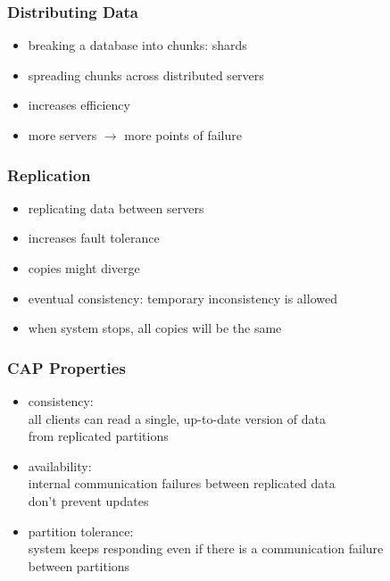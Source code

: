 \documentclass[dvipsnames]{beamer}
\theoremstyle{plain}
\begin{document}
\begin{frame}
  \frametitle{Distributing Data}

  \begin{itemize}
    \item breaking a database into chunks: \alert{shards}
    \item spreading chunks across distributed servers

    \medskip
    \item increases efficiency
    \item more servers $\rightarrow$ more points of failure
  \end{itemize}
\end{frame}

\begin{frame}
  \frametitle{Replication}

  \begin{itemize}
    \item replicating data between servers
    \item increases fault tolerance

    \medskip
    \item copies might diverge
    \item \alert{eventual consistency}: temporary inconsistency is allowed
    \item when system stops, all copies will be the same
  \end{itemize}
\end{frame}

\begin{frame}
  \frametitle{CAP Properties}

  \begin{itemize}
    \item \alert{consistency}:\\
      all clients can read a single, up-to-date version of data\\
      from replicated partitions

    \medskip
    \item \alert{availability}:\\
      internal communication failures between replicated data\\
      don't prevent updates

    \medskip
    \item \alert{partition tolerance}:\\
      system keeps responding even if there is a communication failure\\
      between partitions
  \end{itemize}
\end{frame}
\end{document}
